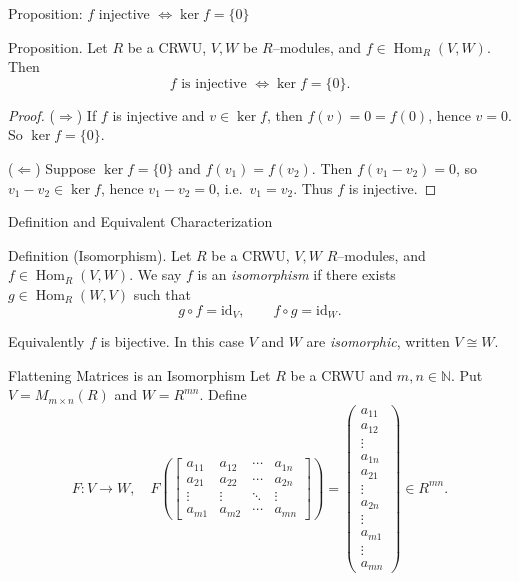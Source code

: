 \begin{frame}{Proposition: $f$ injective $\iff \ker f=\{0\}$}
\begin{block}{Proposition.}
Let $R$ be a CRWU, $V,W$ be $R$–modules, and $f\in\operatorname{Hom}_R(V,W)$. Then
\[
f \text{ is injective } \iff \ker f=\{0\}.
\]
\end{block}

\begin{proof}
($\Rightarrow$) If $f$ is injective and $v\in\ker f$, then $f(v)=0=f(0)$, hence $v=0$. So $\ker f=\{0\}$.

($\Leftarrow$) Suppose $\ker f=\{0\}$ and $f(v_1)=f(v_2)$. Then $f(v_1-v_2)=0$, so $v_1-v_2\in\ker f$, hence $v_1-v_2=0$, i.e.\ $v_1=v_2$. Thus $f$ is injective.
\end{proof}
\end{frame}


\begin{frame}{Definition and Equivalent Characterization}
\begin{block}{Definition (Isomorphism).}
Let $R$ be a CRWU, $V,W$ $R$–modules, and $f\in\operatorname{Hom}_R(V,W)$. We say $f$ is an \emph{isomorphism} if there exists $g\in\operatorname{Hom}_R(W,V)$ such that
\[
g\circ f=\mathrm{id}_V,\qquad f\circ g=\mathrm{id}_W.
\]
\end{block}
\begin{block}{Equivalently}
$f$ is bijective. In this case $V$ and $W$ are \emph{isomorphic}, written $V\cong W$.
\end{block}
\end{frame}

\begin{frame}{Flattening Matrices is an Isomorphism}
Let $R$ be a CRWU and $m,n\in\mathbb{N}$. Put $V=M_{m\times n}(R)$ and $W=R^{mn}$. Define
\[
F:V\to W,\quad
F\!\left(\begin{bmatrix}
a_{11} & a_{12} & \cdots & a_{1n}\\
a_{21} & a_{22} & \cdots & a_{2n}\\
\vdots & \vdots & \ddots & \vdots\\
a_{m1} & a_{m2} & \cdots & a_{mn}
\end{bmatrix}\right)
=
\begin{pmatrix}
a_{11}\\ a_{12}\\ \vdots\\ a_{1n}\\ a_{21}\\ \vdots\\ a_{2n}\\ \vdots\\ a_{m1}\\ \vdots\\ a_{mn}
\end{pmatrix}
\in R^{mn}.
\]
\end{frame}

